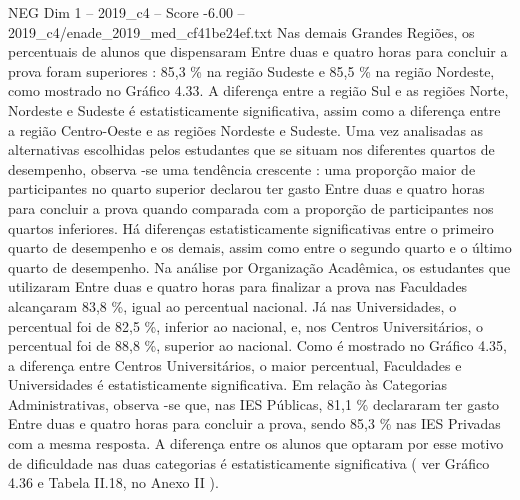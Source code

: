 \begin{textsample}{NEG Dim 1 – 2019\_c4 – Score -6.00 – 2019\_c4/enade\_2019\_med\_cf41be24ef.txt}
Nas demais Grandes Regiões, os percentuais de alunos que dispensaram Entre duas e quatro horas para concluir a prova foram superiores : 85,3 \% na região Sudeste e 85,5 \% na região Nordeste, como mostrado no Gráfico 4.33.
A diferença entre a região Sul e as regiões Norte, Nordeste e Sudeste é estatisticamente significativa, assim como a diferença entre a região Centro-Oeste e as regiões Nordeste e Sudeste.
Uma vez analisadas as alternativas escolhidas pelos estudantes que se situam nos diferentes quartos de desempenho, observa -se uma tendência crescente : uma proporção maior de participantes no quarto superior declarou ter gasto Entre duas e quatro horas para concluir a prova quando comparada com a proporção de participantes nos quartos inferiores.
Há diferenças estatisticamente significativas entre o primeiro quarto de desempenho e os demais, assim como entre o segundo quarto e o último quarto de desempenho.
Na análise por Organização Acadêmica, os estudantes que utilizaram Entre duas e quatro horas para finalizar a prova nas Faculdades alcançaram 83,8 \%, igual ao percentual nacional.
Já nas Universidades, o percentual foi de 82,5 \%, inferior ao nacional, e, nos Centros Universitários, o percentual foi de 88,8 \%, superior ao nacional.
Como é mostrado no Gráfico 4.35, a diferença entre Centros Universitários, o maior percentual, Faculdades e Universidades é estatisticamente significativa.
Em relação às Categorias Administrativas, observa -se que, nas IES Públicas, 81,1 \% declararam ter gasto Entre duas e quatro horas para concluir a prova, sendo 85,3 \% nas IES Privadas com a mesma resposta.
A diferença entre os alunos que optaram por esse motivo de dificuldade nas duas categorias é estatisticamente significativa ( ver Gráfico 4.36 e Tabela II.18, no Anexo II ).

\end{textsample}
